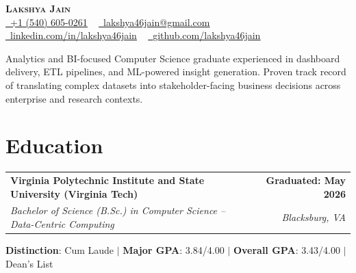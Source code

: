 \documentclass[letterpaper,11pt]{article}
\makeatletter
\newcommand{\resumeEducationSubheading}[4]{
  \vspace{-2pt}\item
    \begin{tabular*}{1.0\textwidth}[t]{l@{\extracolsep{\fill}}r}
      \textbf{#1} & \textbf{\small #2} \\
      \textit{\small#3} & \textit{\small #4} \\
    \end{tabular*}\vspace{-7pt}
}
\newcommand{\resumeSubHeadingListStart}{\begin{itemize}[leftmargin=0.0in, label={}]}
\newcommand{\resumeSubHeadingListEnd}{\end{itemize}}
\makeatother
\begin{document}
\begin{center}
    \textbf{\Huge \scshape Lakshya Jain} \\ \vspace{7.5pt}
    \small{
        \href{tel:1-540-605-0261}{\faPhone\ \underline{+1 (540) 605-0261}} ~
        \href{mailto:lakshya46jain@gmail.com}{\faEnvelope\ \underline{lakshya46jain@gmail.com}} ~
        \href{https://linkedin.com/in/lakshya46jain}{\faLinkedin\ \underline{linkedin.com/in/lakshya46jain}} ~
        \href{https://github.com/lakshya46jain}{\faGithub\ \underline{github.com/lakshya46jain}}
        }
    \vspace{-2.5pt}
\end{center}

\vspace{-4pt}
\begin{center}
    \small{Analytics and BI-focused Computer Science graduate experienced in dashboard delivery, ETL pipelines, and ML-powered insight generation. Proven track record of translating complex datasets into stakeholder-facing business decisions across enterprise and research contexts.}
\end{center}

\section{Education}
    \resumeSubHeadingListStart
        \resumeEducationSubheading
            {Virginia Polytechnic Institute and State University (Virginia Tech)}
            {Graduated: May 2026}
            {Bachelor of Science (B.Sc.) in Computer Science -- Data-Centric Computing}
            {Blacksburg, VA}
            \small{\item[]{\textbf{Distinction}{: Cum Laude} $|$ \textbf{Major GPA}{: 3.84/4.00} $|$ \textbf{Overall GPA}{: 3.43/4.00} $|$ Dean's List}}
    \resumeSubHeadingListEnd
\end{document}
